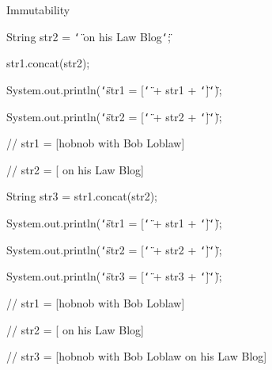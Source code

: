 \documentclass{beamer}
\renewcommand{\textquotedbl}{\texttt{\char`\"}}
\begin{document}
\begin{frame}[allowframebreaks]{Immutability}
\begin{itemize}
\begin{itemize}
\begin{small}
{\ttfamily\color{black}
\textcolor[rgb]{0.13333334,0.54509807,0.13333334}{String}
\textcolor[rgb]{0.627451,0.32156864,0.1764706}{str2} =
\textcolor[rgb]{0.54509807,0.13333334,0.32156864}{{\textquotedbl} on
his Law Blog{\textquotedbl}};}

{\ttfamily\color{black}
str1.concat(str2);}

{\ttfamily\color{black}
System.out.println(\textcolor[rgb]{0.54509807,0.13333334,0.32156864}{{\textquotedbl}str1
= [{\textquotedbl}} + str1 +
\textcolor[rgb]{0.54509807,0.13333334,0.32156864}{{\textquotedbl}]{\textquotedbl}});}

{\ttfamily\color{black}
System.out.println(\textcolor[rgb]{0.54509807,0.13333334,0.32156864}{{\textquotedbl}str2
= [{\textquotedbl}} + str2 +
\textcolor[rgb]{0.54509807,0.13333334,0.32156864}{{\textquotedbl}]{\textquotedbl}});}

{\ttfamily\color{black}
\textcolor[rgb]{0.69803923,0.13333334,0.13333334}{// str1 = [hobnob with
Bob Loblaw]}}

{\ttfamily\color{black}
\textcolor[rgb]{0.69803923,0.13333334,0.13333334}{// str2 = [ on his Law
Blog]}}


\bigskip

{\ttfamily\color{black}
\textcolor[rgb]{0.13333334,0.54509807,0.13333334}{String}
\textcolor[rgb]{0.627451,0.32156864,0.1764706}{str3} =
str1.concat(str2);}

{\ttfamily\color{black}
System.out.println(\textcolor[rgb]{0.54509807,0.13333334,0.32156864}{{\textquotedbl}str1
= [{\textquotedbl}} + str1 +
\textcolor[rgb]{0.54509807,0.13333334,0.32156864}{{\textquotedbl}]{\textquotedbl}});}

{\ttfamily\color{black}
System.out.println(\textcolor[rgb]{0.54509807,0.13333334,0.32156864}{{\textquotedbl}str2
= [{\textquotedbl}} + str2 +
\textcolor[rgb]{0.54509807,0.13333334,0.32156864}{{\textquotedbl}]{\textquotedbl}});}

{\ttfamily\color{black}
System.out.println(\textcolor[rgb]{0.54509807,0.13333334,0.32156864}{{\textquotedbl}str3
= [{\textquotedbl}} + str3 +
\textcolor[rgb]{0.54509807,0.13333334,0.32156864}{{\textquotedbl}]{\textquotedbl}});}

{\ttfamily\color{black}
\textcolor[rgb]{0.69803923,0.13333334,0.13333334}{// str1 = [hobnob with
Bob Loblaw]}}

{\ttfamily\color{black}
\textcolor[rgb]{0.69803923,0.13333334,0.13333334}{// str2 = [ on his Law
Blog]}}

{\ttfamily\color{black}
\textcolor[rgb]{0.69803923,0.13333334,0.13333334}{// str3 = [hobnob with
Bob Loblaw on his Law Blog]}}
\end{small}
    \end{itemize}


\end{itemize}
\end{frame}
\end{document}
